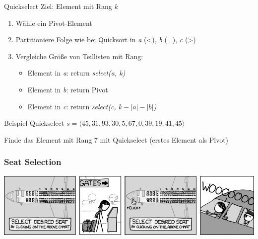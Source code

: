 \begin{frame}{Quickselect}
	Ziel: Element mit Rang \emph{k}
	\begin{enumerate}
		\item Wähle ein Pivot-Element
		\item Partitioniere Folge wie bei Quicksort in \emph{a} (<), \emph{b} (=), \emph{c} (>)
		\item Vergleiche Größe von Teillisten mit Rang:
			\begin{itemize}
				\item Element in \emph{a}: return \emph{select(a, k)}
				\item Element in \emph{b}: return Pivot
				\item Element in \emph{c}: return \emph{select(c, $k - |a| - |b|$)}
			\end{itemize}
	\end{enumerate}
\end{frame}

\begin{frame}{Beispiel Quickselect}
	\(s = \langle 45, 31, 93, 30, 5, 67, 0, 39, 19, 41, 45 \rangle\)

	Finde das Element mit Rang 7 mit Quickselect (erstes Element als Pivot)
\end{frame}

\begin{frame}
	\frametitle{Seat Selection}
	\begin{center}
		\includegraphics[width=\textwidth,height=\textheight,keepaspectratio]{images/seat_selection}
	\end{center}
\end{frame}


